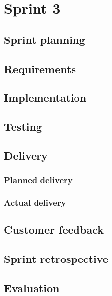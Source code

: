 \section{Sprint 3}

\subsection{Sprint planning}
\subsection{Requirements}
\subsection{Implementation}
\subsection{Testing}
\subsection{Delivery}
\subsubsection{Planned delivery}
\subsubsection{Actual delivery}
\subsection{Customer feedback}
\subsection{Sprint retrospective}
\subsection{Evaluation}